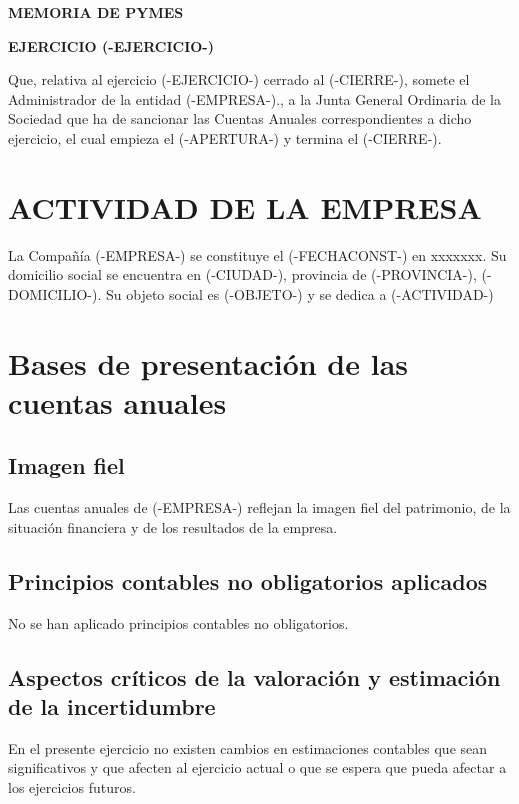 \documentclass[11pt,a4paper]{article}
\begin{document}
\marginsize{3cm}{2cm}{2.5cm}{2.5cm}
\begin{center}
{\huge \textbf {MEMORIA DE PYMES}}
\end{center}

\begin{center}
{\Large \textbf {EJERCICIO (-EJERCICIO-)}}
\end{center}

Que, relativa al ejercicio (-EJERCICIO-) cerrado al (-CIERRE-), somete el Administrador de la entidad (-EMPRESA-)., a la Junta General Ordinaria de la Sociedad que ha de sancionar las Cuentas Anuales correspondientes a dicho ejercicio, el cual empieza el (-APERTURA-) y termina el (-CIERRE-).

\section{ACTIVIDAD DE LA EMPRESA}

La Compañía (-EMPRESA-) se constituye el (-FECHACONST-) en xxxxxxx. Su domicilio social se encuentra en (-CIUDAD-), provincia de (-PROVINCIA-), (-DOMICILIO-). Su objeto social es (-OBJETO-) y se dedica a (-ACTIVIDAD-)


\section{Bases de presentación de las cuentas anuales}

  \subsection{Imagen fiel}
Las cuentas anuales de (-EMPRESA-) reflejan la imagen fiel del patrimonio, de la situación financiera y de los resultados de la empresa.

  \subsection{Principios contables no obligatorios aplicados}
No se han aplicado principios contables no obligatorios.

  \subsection{Aspectos críticos de la valoración y estimación de la incertidumbre}
En el presente ejercicio no existen cambios en estimaciones contables que sean significativos y que afecten al ejercicio actual o que se espera que pueda afectar a los ejercicios futuros.
\end{document}
